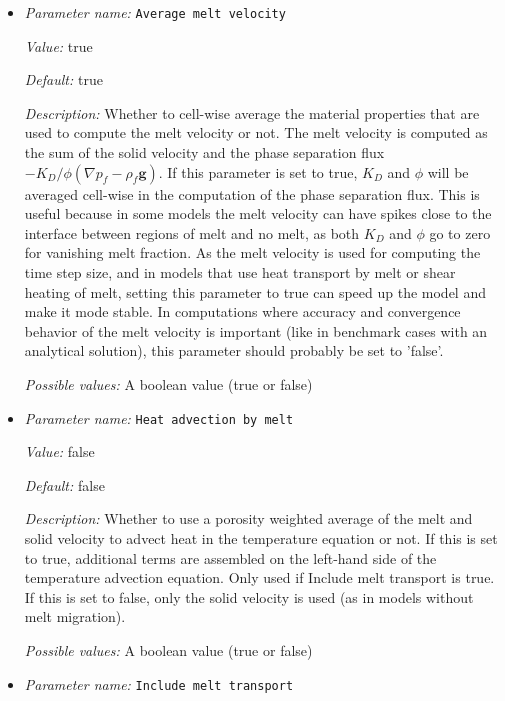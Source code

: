 \begin{itemize}
\item {\it Parameter name:} {\tt Average melt velocity}
\label{parameters:Melt settings/Average melt velocity}


{\it Value:} true


{\it Default:} true


{\it Description:} Whether to cell-wise average the material properties that are used to compute the melt velocity or not. The melt velocity is computed as the sum of the solid velocity and the phase separation flux $ - K_D / \phi (\nabla p_f - \rho_f \mathbf g)$. If this parameter is set to true, $K_D$ and $\phi$ will be averaged cell-wise in the computation of the phase separation flux. This is useful because in some models the melt velocity can have spikes close to the interface between regions of melt and no melt, as both $K_D$ and $\phi$ go to zero for vanishing melt fraction. As the melt velocity is used for computing the time step size, and in models that use heat transport by melt or shear heating of melt, setting this parameter to true can speed up the model and make it mode stable. In computations where accuracy and convergence behavior of the melt velocity is important (like in benchmark cases with an analytical solution), this parameter should probably be set to 'false'.


{\it Possible values:} A boolean value (true or false)
\item {\it Parameter name:} {\tt Heat advection by melt}
\label{parameters:Melt settings/Heat advection by melt}


{\it Value:} false


{\it Default:} false


{\it Description:} Whether to use a porosity weighted average of the melt and solid velocity to advect heat in the temperature equation or not. If this is set to true, additional terms are assembled on the left-hand side of the temperature advection equation. Only used if Include melt transport is true. If this is set to false, only the solid velocity is used (as in models without melt migration).


{\it Possible values:} A boolean value (true or false)
\item {\it Parameter name:} {\tt Include melt transport}
\label{parameters:Melt settings/Include melt transport}



\end{itemize}
